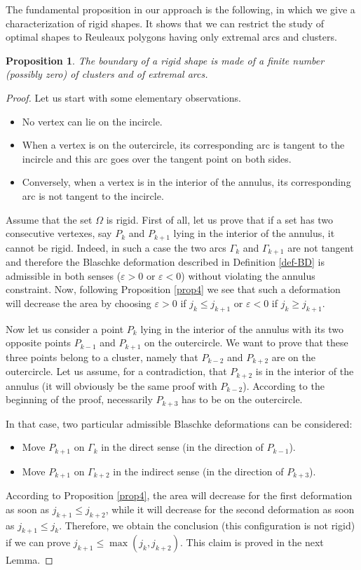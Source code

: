 \documentclass[JEP,XML,SOM,Unicode,NoFloatCountersInSection]{cedram}
\let\epsilon\varepsilon
\theoremstyle{plain}
\newtheorem{proposition}[theorem]{Proposition}
\theoremstyle{definition}
\let \e\epsilon
\begin{document}
The fundamental proposition in our approach is the following, {in which we give a characterization of rigid shapes}. It shows that we can restrict
the study of optimal shapes to Reuleaux polygons having only extremal arcs and clusters.
\begin{proposition}\label{propfund}
The boundary of a rigid shape is made of a finite number (possibly zero) of clusters and of extremal arcs.
\end{proposition}
\begin{proof}
Let us start with some elementary observations.
\begin{itemize}
\item No vertex can lie on the incircle.
\item When a vertex is on the outercircle, its corresponding arc is tangent to the incircle
and this arc goes over the tangent point on both sides.
\item Conversely, when a vertex is in the interior of the annulus, its corresponding arc is not
tangent to the incircle.
\end{itemize}

Assume that the set $\Omega$ is rigid.
First of all, let us prove that if a set has two consecutive vertexes, say $P_k$ and $P_{k+1}$
lying in the interior of the annulus, it cannot be rigid. Indeed, in such a case the two arcs
$\Gamma_k$ and $\Gamma_{k+1}$ are not tangent
and therefore the Blaschke deformation described in Definition
\ref{def-BD} is admissible in both senses ($\e>0$ or $\e<0$) without violating the annulus
constraint. Now, following Proposition \ref{prop4} we see that such a deformation will decrease the area by choosing $\e>0$ if $j_k\leq j_{k+1}$ or $\e<0$ if $j_k\geq j_{k+1}$.

Now let us consider a point $P_k$ lying in the interior of the annulus with its two
opposite points $P_{k-1}$ and $P_{k+1}$ on the outercircle. We want to prove
that these three points belong to a cluster, namely that $P_{k-2}$ and $P_{k+2}$ are
on the outercircle. Let us assume, for a contradiction, that $P_{k+2}$ is in the interior
of the annulus (it will obviously be the same proof with $P_{k-2}$). According to the beginning of the
proof, necessarily $P_{k+3}$ has to be on the outercircle.

In that case, two particular admissible Blaschke deformations can be considered:
\begin{itemize}
\item Move $P_{k+1}$ on $\Gamma_k$ in the direct sense (in the direction of $P_{k-1}$).
\item Move $P_{k+1}$ on $\Gamma_{k+2}$ in the indirect sense (in the direction of $P_{k+3}$).
\end{itemize}
According to Proposition \ref{prop4}, the area will decrease for the first deformation
as soon as $j_{k+1} \leq j_{k+2}$, while it will decrease for the second deformation
as soon as $j_{k+1} \leq j_{k}$. Therefore, we obtain the conclusion (this configuration
is not rigid) if we can prove $j_{k+1} \leq \max(j_{k},j_{k+2})$. This claim is proved in the next Lemma.
\end{proof}
\end{document}
